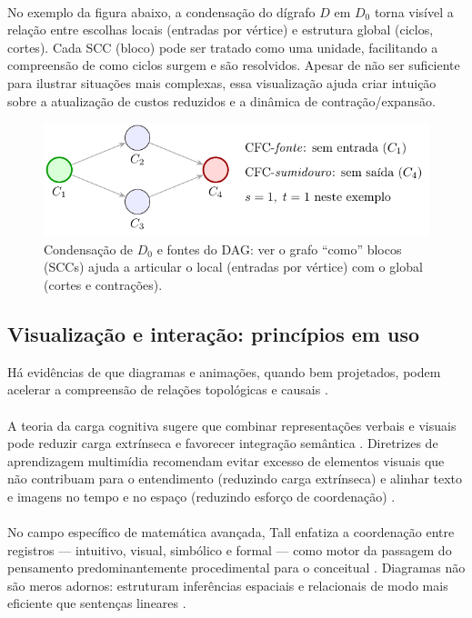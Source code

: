 \documentclass[12pt,a4paper]{article}
\begin{document}
\paragraph{}
No exemplo da figura abaixo, a condensação do dígrafo \(D\) em \(D_0\) torna visível a relação entre escolhas locais (entradas por vértice) e estrutura global (ciclos, cortes). Cada SCC (bloco) pode ser tratado como uma unidade, facilitando a compreensão de como ciclos surgem e são resolvidos. Apesar de não ser suficiente para ilustrar situações mais complexas, essa visualização ajuda criar intuição sobre a atualização de custos reduzidos e a dinâmica de contração/expansão.

\begin{figure}[H]
    \centering
    \includegraphics[width=.72\linewidth]{figures/fig_condensado_st.pdf}
    \caption{Condensação de $D_0$ e fontes do DAG: ver o grafo “como” blocos (SCCs) ajuda a articular o local (entradas por vértice) com o global (cortes e contrações).}
    \label{fig:didatica-condensado}
\end{figure}

\subsection{Visualização e interação: princípios em uso}
Há evidências de que diagramas e animações, quando bem projetados, podem acelerar a compreensão de relações topológicas e causais \cite{larkin1987diagram,ware2012information}.

\paragraph{}
A teoria da carga cognitiva sugere que combinar representações verbais e visuais pode reduzir carga extrínseca e favorecer integração semântica \cite{mayer2009multimedia,paivio1990}. Diretrizes de aprendizagem multimídia recomendam evitar excesso de elementos visuais que não contribuam para o entendimento (reduzindo carga extrínseca) e alinhar texto e imagens no tempo e no espaço (reduzindo esforço de coordenação) \cite{mayer2009multimedia}.

\paragraph{}
No campo específico de matemática avançada, Tall enfatiza a coordenação entre registros — intuitivo, visual, simbólico e formal — como motor da passagem do pensamento predominantemente procedimental para o conceitual \cite{tall1991advanced}. Diagramas não são meros adornos: estruturam inferências espaciais e relacionais de modo mais eficiente que sentenças lineares \cite{larkin1987diagram}.
\end{document}
